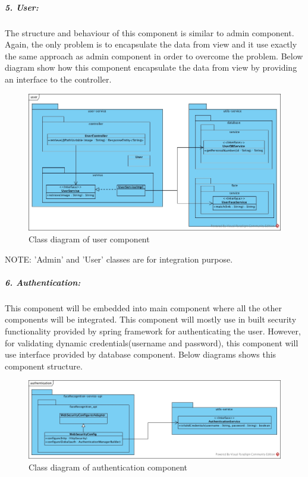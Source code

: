 \documentclass[a4paper,11pt]{article}
\begin{document}
\subparagraph{5. User: }The structure and behaviour of this component is similar to admin component. Again, the only problem is to encapsulate the data from view and it use exactly the same approach as admin component in order to overcome the problem. Below diagram show how this component encapsulate the data from view by providing an interface to the controller.

\begin{figure}[ht!]
    \centering
	\includegraphics[width=130mm]{ClassDiagrams/new/user.jpg}
	\caption{Class diagram of user component}
\end{figure}

NOTE: 'Admin' and 'User' classes are  for integration purpose.


\newpage
\subparagraph{6. Authentication: } This component will be embedded into main component where all the other components will be integrated. This component will mostly use in built security functionality provided by spring framework for authenticating the user. However, for validating dynamic credentials(username and password), this component will use interface provided by database component. Below diagrams shows this component structure.

\begin{figure}[ht!]
    \centering
	\includegraphics[width=130mm]{ClassDiagrams/new/authentication.jpg}
	\caption{Class diagram of authentication component}
\end{figure}
\end{document}
